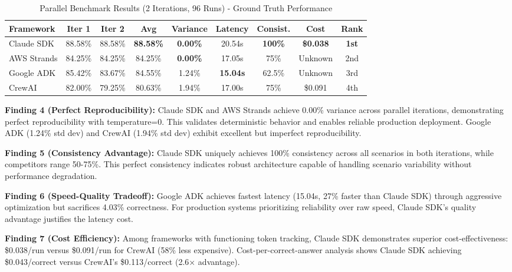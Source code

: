 \documentclass[sigconf,nonacm]{acmart}
\begin{document}
\begin{table}[t]
\caption{Parallel Benchmark Results (2 Iterations, 96 Runs) - Ground Truth Performance}
\label{tab:parallel-combined}
\begin{tabular}{lcccccccc}
\toprule
\textbf{Framework} & \textbf{Iter 1} & \textbf{Iter 2} & \textbf{Avg} & \textbf{Variance} & \textbf{Latency} & \textbf{Consist.} & \textbf{Cost} & \textbf{Rank} \\
\midrule
Claude SDK & 88.58\% & 88.58\% & \textbf{88.58\%} & \textbf{0.00\%} & 20.54s & \textbf{100\%} & \textbf{\$0.038} & \textbf{1st} \\
AWS Strands & 84.25\% & 84.25\% & 84.25\% & \textbf{0.00\%} & 17.05s & 75\% & Unknown & 2nd \\
Google ADK & 85.42\% & 83.67\% & 84.55\% & 1.24\% & \textbf{15.04s} & 62.5\% & Unknown & 3rd \\
CrewAI & 82.00\% & 79.25\% & 80.63\% & 1.94\% & 17.00s & 75\% & \$0.091 & 4th \\
\bottomrule
\end{tabular}
\end{table}

\textbf{Finding 4 (Perfect Reproducibility):} Claude SDK and AWS Strands achieve 0.00\% variance across parallel iterations, demonstrating perfect reproducibility with temperature=0. This validates deterministic behavior and enables reliable production deployment. Google ADK (1.24\% std dev) and CrewAI (1.94\% std dev) exhibit excellent but imperfect reproducibility.

\textbf{Finding 5 (Consistency Advantage):} Claude SDK uniquely achieves 100\% consistency across all scenarios in both iterations, while competitors range 50-75\%. This perfect consistency indicates robust architecture capable of handling scenario variability without performance degradation.

\textbf{Finding 6 (Speed-Quality Tradeoff):} Google ADK achieves fastest latency (15.04s, 27\% faster than Claude SDK) through aggressive optimization but sacrifices 4.03\% correctness. For production systems prioritizing reliability over raw speed, Claude SDK's quality advantage justifies the latency cost.

\textbf{Finding 7 (Cost Efficiency):} Among frameworks with functioning token tracking, Claude SDK demonstrates superior cost-effectiveness: \$0.038/run versus \$0.091/run for CrewAI (58\% less expensive). Cost-per-correct-answer analysis shows Claude SDK achieving \$0.043/correct versus CrewAI's \$0.113/correct (2.6× advantage).
\end{document}
